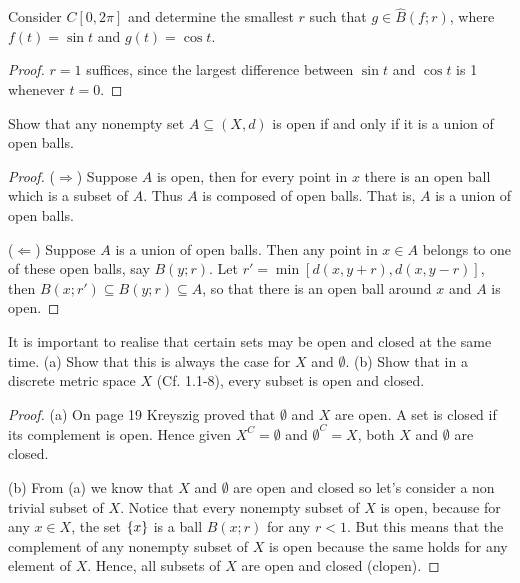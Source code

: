 \begin{exercise}{3}
Consider $C[0,2\pi]$ and determine the smallest $r$ such that $g\in \hat{B}(f;r)$, where $f(t)=\sin t$ and $g(t)=\cos t$.
\end{exercise}
\begin{proof}
$r=1$ suffices, since the largest difference between $\sin t$ and $\cos t$ is 1 whenever $t=0$.
\end{proof}

\begin{exercise}{4}
Show that any nonempty set $A\subseteq (X,d)$ is open if and only if it is a union of open balls.
\end{exercise}
\begin{proof}
($\Rightarrow$) Suppose $A$ is open, then for every point in $x$ there is an open ball which is a subset of $A$. Thus $A$ is composed of open balls. That is, $A$ is a union of open balls.

($\Leftarrow$) Suppose $A$ is a union of open balls. Then any point in $x\in A$ belongs to one of these open balls, say $B(y;r)$. Let $r'=\min[d(x,y+r), d(x,y-r)]$, then $B(x;r')\subseteq B(y;r)\subseteq A$, so that there is an open ball around $x$ and $A$ is open.
\end{proof}

\begin{exercise}{5}
It is important to realise that certain sets may be open and closed at the same time. (a) Show that this is always the case for $X$ and $\emptyset$. (b) Show that in a discrete metric space $X$ (Cf. 1.1-8), every subset is open and closed.
\end{exercise}
\begin{proof}
(a) On page 19 Kreyszig proved that $\emptyset$ and $X$ are open. A set is closed if its complement is open. Hence given $X^C=\emptyset$ and $\emptyset^C=X$, both $X$ and $\emptyset$ are closed.

(b) From (a) we know that $X$ and $\emptyset$ are open and closed so let's consider a non trivial subset of $X$. Notice that every nonempty subset of $X$ is open, because for any $x\in X$, the set $\{x\}$ is a ball $B(x; r)$ for any $r<1$. But this means that the complement of any nonempty subset of $X$ is open because the same holds for any element of $X$. Hence, all subsets of $X$ are open and closed (clopen).
\end{proof}

